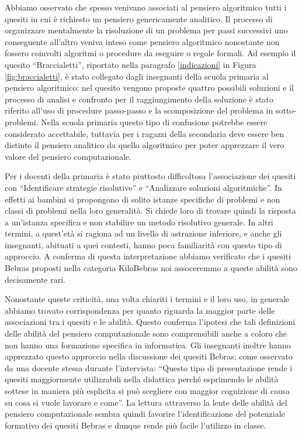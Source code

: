 \documentclass[12pt]{report}
\begin{document}
Abbiamo osservato che spesso venivano associati al pensiero algoritmico tutti i quesiti in cui è richiesto un pensiero genericamente analitico. Il processo di organizzare mentalmente la risoluzione di un problema per passi successivi uno conseguente all'altro veniva inteso come pensiero algoritmico nonostante non fossero coinvolti algoritmi o procedure da eseguire o regole formali. Ad esempio il quesito ``Braccialetti'', riportato nella paragrafo \ref{indicazioni} in Figura \ref{fig:braccialetti}, è stato collegato dagli insegnanti della scuola primaria al pensiero algoritmico: nel quesito vengono proposte quattro possibili soluzioni e il processo di analisi e confronto per il raggiungimento della soluzione è stato riferito all'uso di procedure passo-passo e la scomposizione del problema in sotto-problemi. Nella scuola primaria questo tipo di confusione potrebbe essere considerato accettabile, tuttavia per i ragazzi della secondaria deve essere ben distinto il pensiero analitico da quello algoritmico per poter apprezzare il vero valore del pensiero computazionale.


Per i docenti della primaria è stato piuttosto difficoltosa l'associazione dei quesiti con ``Identificare strategie risolutive'' e ``Analizzare soluzioni algoritmiche''. In effetti ai bambini si propongono di solito istanze specifiche di problemi e non classi di problemi nella loro generalità. Si chiede loro di trovare quindi la risposta a un'istanza specifica e non stabilire un metodo risolutivo generale. In altri termini, a quest'età si ragiona ad un livello di astrazione inferiore, e anche gli insegnanti, abituati a quei contesti, hanno poca familiarità con questo tipo di approccio. A conferma di questa interpretazione abbiamo verificato che i quesiti Bebras proposti nella categoria KiloBebras noi assoceremmo a queste abilità sono decisamente rari.



Nonostante queste criticità, una volta chiariti i termini e il loro uso, in generale abbiamo trovato corrispondenza per quanto riguarda la maggior parte delle associazioni tra i quesiti e le abilità. Questo conferma l'ipotesi che tali definizioni delle abilità del pensiero computazionale sono comprensibili anche a coloro che non hanno una formazione specifica in informatica. Gli insegnanti inoltre hanno apprezzato questo approccio nella discussione dei quesiti Bebras; come osservato da una docente stessa durante l'intervista: ``Questo tipo di presentazione rende i quesiti maggiormente utilizzabili nella didattica perché esprimendo le abilità sottese in maniera più esplicita si può scegliere con maggior cognizione di causa su cosa si vuole lavorare e come''.
La lettura attraverso la lente delle abilità del pensiero computazionale sembra quindi favorire l'identificazione del potenziale formativo dei quesiti Bebras e dunque rende più facile l'utilizzo in classe.
\end{document}
